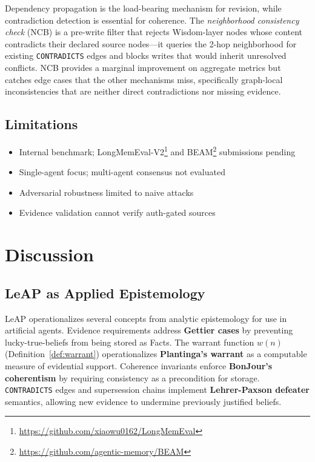 \documentclass[11pt,letterpaper]{article}
\begin{document}
Dependency propagation is the load-bearing mechanism for revision, while contradiction detection is essential for coherence. The \emph{neighborhood consistency check} (NCB) is a pre-write filter that rejects Wisdom-layer nodes whose content contradicts their declared source nodes---it queries the 2-hop neighborhood for existing \texttt{CONTRADICTS} edges and blocks writes that would inherit unresolved conflicts. NCB provides a marginal improvement on aggregate metrics but catches edge cases that the other mechanisms miss, specifically graph-local inconsistencies that are neither direct contradictions nor missing evidence.

\subsection{Limitations}

\begin{itemize}[noitemsep]
    \item Internal benchmark; LongMemEval-V2\footnote{\url{https://github.com/xiaowu0162/LongMemEval}} and BEAM\footnote{\url{https://github.com/agentic-memory/BEAM}} submissions pending
    \item Single-agent focus; multi-agent consensus not evaluated
    \item Adversarial robustness limited to naive attacks
    \item Evidence validation cannot verify auth-gated sources
\end{itemize}

\section{Discussion}
\label{sec:discussion}

\subsection{LeAP as Applied Epistemology}

LeAP operationalizes several concepts from analytic epistemology for use in artificial agents. Evidence requirements address \textbf{Gettier cases} by preventing lucky-true-beliefs from being stored as Facts. The warrant function $w(n)$ (Definition~\ref{def:warrant}) operationalizes \textbf{Plantinga's warrant} as a computable measure of evidential support. Coherence invariants enforce \textbf{BonJour's coherentism} by requiring consistency as a precondition for storage. \texttt{CONTRADICTS} edges and supersession chains implement \textbf{Lehrer-Paxson defeater} semantics, allowing new evidence to undermine previously justified beliefs.
\end{document}
